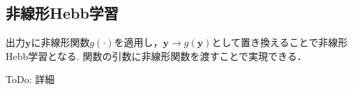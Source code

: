 \subsection{非線形Hebb学習}
出力$\mathbf{y}$に非線形関数$g(\cdot)$を適用し，$\mathbf{y}\to g(\mathbf{y})$として置き換えることで非線形Hebb学習となる\cite{Oja1997-hr}\cite{Brito2016-mx}. 関数の引数に非線形関数を渡すことで実現できる．

ToDo: 詳細
